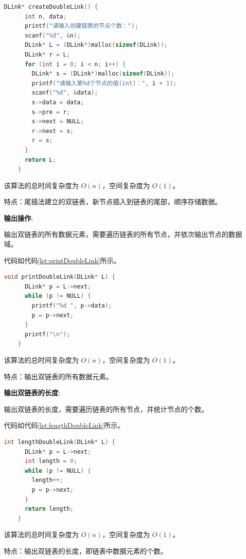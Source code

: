 \documentclass[lang=cn,newtx,10pt,scheme=chinese]{elegantbook}
\begin{document}
  \begin{lstlisting}[language=C++, caption={尾插法建立双链表示例代码}, label={lst:tailInsertDouble}]
    DLink* createDoubleLink() {
      int n, data;
      printf("请输入创建链表的节点个数：");
      scanf("%d", &n);
      DLink* L = (DLink*)malloc(sizeof(DLink));
      DLink* r = L;
      for (int i = 0; i < n; i++) {
        DLink* s = (DLink*)malloc(sizeof(DLink));
        printf("请输入第%d个节点的值(int)：", i + 1);
        scanf("%d", &data);
        s->data = data;
        s->pre = r;
        s->next = NULL;
        r->next = s;
        r = s;
      }
      return L;
    }
  \end{lstlisting}
  该算法的总时间复杂度为 $O(n)$，空间复杂度为 $O(1)$。

  特点：尾插法建立的双链表，新节点插入到链表的尾部，顺序存储数据。

  \textbf{输出操作}:

  输出双链表的所有数据元素，需要遍历链表的所有节点，并依次输出节点的数据域。

  代码如代码\ref{lst:printDoubleLink}所示。

  \begin{lstlisting}[language=C++, caption={输出双链表示例代码}, label={lst:printDoubleLink}]
    void printDoubleLink(DLink* L) {
      DLink* p = L->next;
      while (p != NULL) {
        printf("%d ", p->data);
        p = p->next;
      }
      printf("\n");
    }
  \end{lstlisting}

  该算法的总时间复杂度为 $O(n)$，空间复杂度为 $O(1)$。

  特点：输出双链表的所有数据元素。

  \textbf{输出双链表的长度}:

  输出双链表的长度，需要遍历链表的所有节点，并统计节点的个数。

  代码如代码\ref{lst:lengthDoubleLink}所示。

  \begin{lstlisting}[language=C++, caption={输出双链表长度示例代码}, label={lst:lengthDoubleLink}]
    int lengthDoubleLink(DLink* L) {
      DLink* p = L->next;
      int length = 0;
      while (p != NULL) {
        length++;
        p = p->next;
      }
      return length;
    }
  \end{lstlisting}

  该算法的总时间复杂度为 $O(n)$，空间复杂度为 $O(1)$。

  特点：输出双链表的长度，即链表中数据元素的个数。
\end{document}
